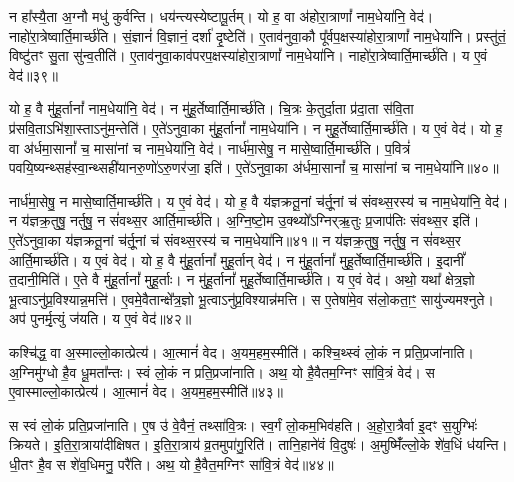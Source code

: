    न हा᳚स्यै॒ता अ॒ग्नौ मधु॑ कुर्वन्ति।
   धय॑न्त्यस्येष्टापू॒र्तम्।
   यो ह॒ वा अ॑होरा॒त्राणां᳚ नाम॒धेया॑नि॒ वेद॑।
   नाहो॑रा॒त्रेष्वार्ति॒मार्च्छ॑ति।
   सं॒ज्ञानं॑ वि॒ज्ञानं॒ दर्\mbox{}शा॑ दृ॒ष्टेति॑।
   ए॒ताव॑नुवा॒कौ पू᳚र्वप॒क्षस्या॑\-होरा॒त्राणां᳚ नाम॒धेया॑नि।
   प्रस्तु॑तं॒ विष्टु॑तꣳ सु॒ता सु॑न्व॒तीति॑।
   ए॒ताव॑नुवा॒काव॑पर\-प॒क्षस्या॑होरा॒त्राणां᳚ नाम॒धेया॑नि।
   नाहो॑रा॒त्रेष्वार्ति॒मार्च्छ॑ति।
   य ए॒वं वेद॑॥३९॥

   यो ह॒ वै मु॑हू॒र्तानां᳚ नाम॒धेया॑नि॒ वेद॑।
   न मु॑हू॒र्तेष्वार्ति॒मार्च्छ॑ति।
   चि॒त्रः के॒तुर्दा॒ता प्र॑दा॒ता स॑वि॒ता प्र॑सवि॒ताऽभि॑शा॒स्ताऽनु॑\-म॒न्तेति॑।
   ए॒ते॑ऽनुवा॒का मु॑हू॒र्तानां᳚ नाम॒धेया॑नि।
   न मुहू॒र्तेष्वार्ति॒मार्च्छ॑ति।
   य ए॒वं वेद॑।
   यो ह॒ वा अ॑र्धमा॒सानां᳚ च॒ मासा॑नां च नाम॒धेया॑नि॒ वेद॑।
   नार्ध॑मा॒सेषु॒ न मासे॒ष्वार्ति॒मार्च्छ॑ति।
   प॒वित्रं॑ पवयि॒ष्यन्थ्सह॑\-स्वा॒न्थ्सही॑यानरु॒णो॑ऽरु॒णर॑जा॒ इति॑।
   ए॒ते॑ऽनुवा॒का अ॑र्धमा॒सानां᳚ च॒ मासा॑नां च नाम॒धेया॑नि॥४०॥

   नार्ध॑मा॒सेषु॒ न मासे॒ष्वार्ति॒मार्च्छ॑ति।
   य ए॒वं वेद॑।
   यो ह॒ वै य॑ज्ञक्रतू॒नां च॑र्तू॒नां च॑ संवथ्स॒रस्य॑ च नाम॒धेया॑नि॒ वेद॑।
   न य॑ज्ञक्र॒तुषु॒ नर्तुषु॒ न सं॑वथ्स॒र आर्ति॒मार्च्छ॑ति।
   अ॒ग्नि॒ष्टो॒म उ॒क्थ्यो᳚ऽग्निर्{‌}ऋ॒तुः प्र॒जाप॑तिः संवथ्स॒र इति॑।
   ए॒ते॑ऽनुवा॒का य॑ज्ञक्रतू॒नां च॑र्तू॒नां च॑ संवथ्स॒रस्य॑ च नाम॒धेया॑नि॥४१॥
   न य॑ज्ञक्र॒तुषु॒ नर्तुषु॒ न सं॑वथ्स॒र आर्ति॒मार्च्छ॑ति।
   य ए॒वं वेद॑।
   यो ह॒ वै मु॑हू॒र्तानां᳚ मुहू॒र्तान् वेद॑।
   न मु॑हू॒र्तानां᳚ मुहू॒र्तेष्वार्ति॒मार्च्छ॑ति।
   इ॒दानीं᳚ त॒दानी॒मिति॑।
   ए॒ते वै मु॑हू॒र्तानां᳚ मुहू॒र्ताः।
   न मु॑हू॒र्तानां᳚ मुहू॒र्तेष्वार्ति॒मार्च्छ॑ति।
   य ए॒वं वेद॑।
   अथो॒ यथा᳚ क्षेत्र॒ज्ञो भू॒त्वाऽनु॑प्र॒विश्यान्न॒मत्ति॑।
   ए॒वमे॒वैतान्क्षे᳚त्र॒ज्ञो भू॒त्वाऽनु॑प्र॒विश्यान्न॑मत्ति।
   स ए॒तेषा॑मे॒व स॑लो॒कता॒ꣳ॒ सायु॑ज्यमश्नुते।
   अप॑ पुनर्मृ॒त्युं ज॑यति।
   य ए॒वं वेद॑॥४२॥
\anuvakamend
				
   कश्चि॑द्ध॒ वा अ॒स्माल्लो॒कात्प्रेत्य॑।
   आ॒त्मानं॑ वेद।
   अ॒यम॒हम॒स्मीति॑।
   कश्चि॒थ्स्वं लो॒कं न प्रति॒प्रजा॑नाति।
   अ॒ग्निमु॑ग्धो है॒व धू॒मता᳚न्तः।
   स्वं लो॒कं न प्रति॒प्रजा॑नाति।
   अथ॒ यो है॒वैतम॒ग्निꣳ सा॑वि॒त्रं वेद॑।
   स ए॒वास्माल्लो॒कात्प्रेत्य॑।
   आ॒त्मानं॑ वेद।
   अ॒यम॒हम॒स्मीति॑॥४३॥

   स स्वं लो॒कं प्रति॒प्रजा॑नाति।
   ए॒ष उ॑ वे॒वैनं॒ तथ्सा॑वि॒त्रः।
   स्व॒र्गं लो॒कम॒भिव॑हति।
   अ॒हो॒रा॒त्रैर्वा इ॒दꣳ स॒युग्भिः॑ क्रियते।
   इ॒ति॒रा॒त्राया॑दीक्षिषत।
   इ॒ति॒रा॒त्राय॑ व्र॒तमुपा॑गु॒रिति॑।
   तानि॒हाने॑वं वि॒दुषः॑।
   अ॒मुष्मिँ॑ल्लो॒के शे॑व॒धिं ध॑यन्ति।
   धी॒तꣳ है॒व स शे॑व॒धिमनु॒ परै॑ति।
   अथ॒ यो है॒वैत॒मग्निꣳ सा॑वि॒त्रं वेद॑॥४४॥

